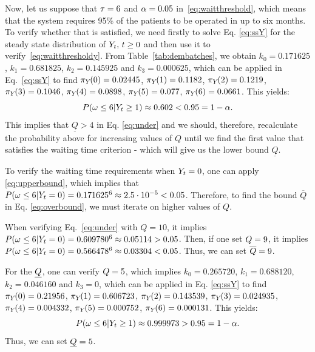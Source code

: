 \begin{ex}
Now, let us suppose that $\tau = 6$ and $\alpha = 0.05$ in~\eqref{eq:waitthreshold}, which means that the system requires 95\% of the patients to be operated in up to six months. To verify whether that is satisfied, we need firstly to solve Eq. \eqref{eq:ssY} for the steady state distribution of $Y_{t}, \, t \ge 0$ and then use it to verify~\eqref{eq:waitthresholdy}. From Table~\ref{tab:dembatches}, we obtain $k_0=0.171625$,  $k_1=0.681825$, $k_2 = 0.145925$ and $k_3=0.000625$, which can be applied in Eq.~\eqref{eq:ssY} to find $\pi_{Y_{}}(0) = 0.02445$, $\pi_{Y_{}}(1) = 0.1182$, $\pi_{Y_{}}(2) = 0.1219$, $\pi_{Y_{}}(3) = 0.1046$, $\pi_{Y_{}}(4) = 0.0898$, $\pi_{Y_{}}(5) = 0.077$, $\pi_{Y_{}}(6) = 0.0661$. This yields:
\[
P(\omega \le 6 | Y_{t} \ge 1) \approx 0.602 < 0.95 = 1 - \alpha.
\]
%
This implies that $\underline Q > 4$ in Eq. \eqref{eq:under} and we should, therefore, recalculate the probability above for increasing values of $Q$ until we find the first value that satisfies the waiting time criterion - which will give us the lower bound $\underline Q$.

To verify the waiting time requirements when $Y_{t} = 0$, one can apply \eqref{eq:upperbound}, which implies that $P(\omega \le 6 | Y_{t} = 0) = 0.171625^6 \approx 2.5 \cdot 10^{-5} < 0.05$. Therefore, to find the bound $\overline Q$ in Eq. \eqref{eq:overbound}, we must iterate on higher values of $Q$.

When verifying Eq.~\eqref{eq:under} with $Q = 10$, it implies $P(\omega \le 6 | Y_{t} = 0) = 0.609780^6 \approx 0.05114 > 0.05$. Then, if one set $Q = 9$, it implies $P(\omega \le 6 | Y_{t} = 0) = 0.566478^6 \approx 0.03304 < 0.05$. Thus, we can set $\overline{Q} = 9$.

For the $\underline{Q}$, one can verify $Q = 5$, which implies $k_0=0.265720$,  $k_1=0.688120$, $k_2 = 0.046160$ and $k_3=0$, which can be applied in Eq. \eqref{eq:ssY} to find $\pi_{Y_{}}(0) = 0.21956$, $\pi_{Y_{}}(1) = 0.606723$, $\pi_{Y_{}}(2) = 0.143539$, $\pi_{Y_{}}(3) = 0.024935$, $\pi_{Y_{}}(4) = 0.004332$, $\pi_{Y_{}}(5) = 0.000752$, $\pi_{Y_{}}(6) = 0.000131$. This yields:
\[
P(\omega \le 6 | Y_{t} \ge 1) \approx 0.999973 > 0.95 = 1 - \alpha.
\]
%
Thus, we can set $\underline{Q} = 5$.
%
%
\end{ex}